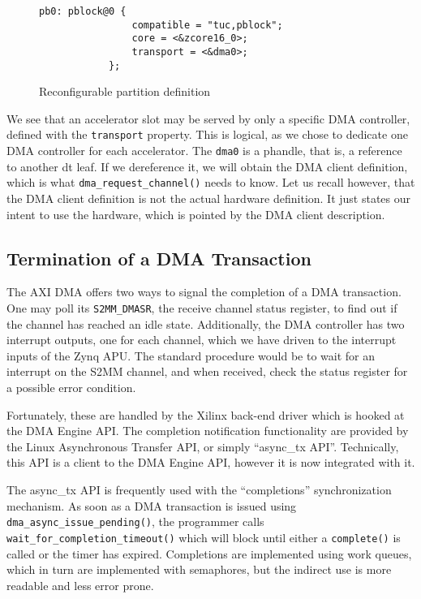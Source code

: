 \begin{figure}[H]
\centering
\begin{lstlisting}[style=basic]
		pb0: pblock@0 {
				compatible = "tuc,pblock";
				core = <&zcore16_0>;
				transport = <&dma0>;
			};
\end{lstlisting}
\caption{Reconfigurable partition definition}
\label{lst:pblock-2}
\end{figure}

We see that an accelerator slot may be served by only a specific DMA controller,
defined with the \texttt{transport} property.
This is logical, as we chose to dedicate one DMA controller for each accelerator.
The \texttt{dma0} is a phandle, that is, a reference to another \gls{dt} leaf.
If we dereference it, we will obtain the DMA client definition, which is what
\texttt{dma\_request\_channel()} needs to know. Let us recall however,
that the DMA client definition is not the actual hardware definition.
It just states our intent to use the hardware, which is pointed by the DMA client
description.


\subsection{Termination of a DMA Transaction}

The AXI DMA offers two ways to signal the completion of a DMA transaction. 
One may poll its \texttt{S2MM\_DMASR}, the receive channel status register,
to find out if the channel has reached an idle state. Additionally,
the DMA controller has two interrupt outputs, one for each channel,
which we have driven to the interrupt inputs of the Zynq APU. 
The standard procedure would be to wait for an interrupt on the S2MM channel,
and when received, check the status register for a possible error condition.

Fortunately, these are handled by the Xilinx back-end driver which is hooked
at the DMA Engine API. The completion notification functionality
are provided by the Linux Asynchronous Transfer API, or simply ``async\_tx API''. 
Technically, this API is a client to the DMA Engine API, 
however it is now integrated with it.

The async\_tx API is frequently used with the ``completions'' synchronization mechanism.
As soon as a DMA transaction is issued using \texttt{dma\_async\_issue\_pending()},
the programmer calls \texttt{wait\_for\_completion\_timeout()} which will block
until either a \texttt{complete()} is called or the timer has expired.
Completions are implemented using work queues, which in turn are implemented with semaphores,
but the indirect use is more readable and less error prone.

